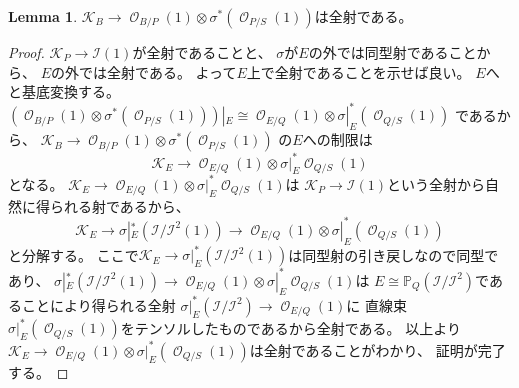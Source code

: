 \documentclass[uplatex]{jsarticle}
\theoremstyle{definition}
\newtheorem{lem}[lem]{Lemma}
\renewcommand{\P}{\mathbb{P}}
\newcommand{\mcI}{\mathcal{I}}
\newcommand{\mcK}{\mathcal{K}}
\newcommand{\mcO}{\mathcal{O}}
\DeclareMathOperator{\OOO}{\mcO}
\newcommand{\OO}[1]{\OOO_{#1}}
\begin{document}
\begin{lem}
  \(\mcK_B\to \OO{B/P}(1)\otimes \sigma^*(\OO{P/S}(1))\)は全射である。
\end{lem}

\begin{proof}
  \(\mcK_P\to \mcI(1)\)が全射であることと、
  \(\sigma\)が\(E\)の外では同型射であることから、
  \(E\)の外では全射である。
  よって\(E\)上で全射であることを示せば良い。
  \(E\)へと基底変換する。
  \(
  (\OO{B/P}(1) \otimes \sigma^*(\OO{P/S}(1)))|_E
  \cong \OO{E/Q}(1) \otimes \sigma|_E^*(\OO{Q/S}(1))
  \)
  であるから、
  \(\mcK_B\to \OO{B/P}(1)\otimes \sigma^*(\OO{P/S}(1))\)
  の\(E\)への制限は
  \[
  \mcK_E\to \OO{E/Q}(1) \otimes \sigma|_E^*\OO{Q/S}(1)
  \]
  となる。
  \(\mcK_E\to \OO{E/Q}(1) \otimes \sigma|_E^*\OO{Q/S}(1)\)は
  \(\mcK_P\to \mcI(1)\)という全射から自然に得られる射であるから、
  \[\mcK_E \to \sigma|_E^*(\mcI/\mcI^2(1)) \to
  \OO{E/Q}(1) \otimes \sigma|_E^*(\OO{Q/S}(1))\]
  と分解する。
  ここで\(\mcK_E \to \sigma|_E^*(\mcI/\mcI^2(1))\)は同型射の引き戻しなので同型であり、
  \(\sigma|_E^*(\mcI/\mcI^2(1)) \to
  \OO{E/Q}(1) \otimes \sigma|_E^*\OO{Q/S}(1)\)は
  \(E\cong \P_Q(\mcI/\mcI^2)\)であることにより得られる全射
  \(\sigma|_E^*(\mcI/\mcI^2)\to \OO{E/Q}(1)\)に
  直線束\(\sigma|_E^*(\OO{Q/S}(1))\)をテンソルしたものであるから全射である。
  以上より\(\mcK_E\to \OO{E/Q}(1) \otimes \sigma|_E^*(\OO{Q/S}(1))\)は全射であることがわかり、
  証明が完了する。
\end{proof}
\end{document}
